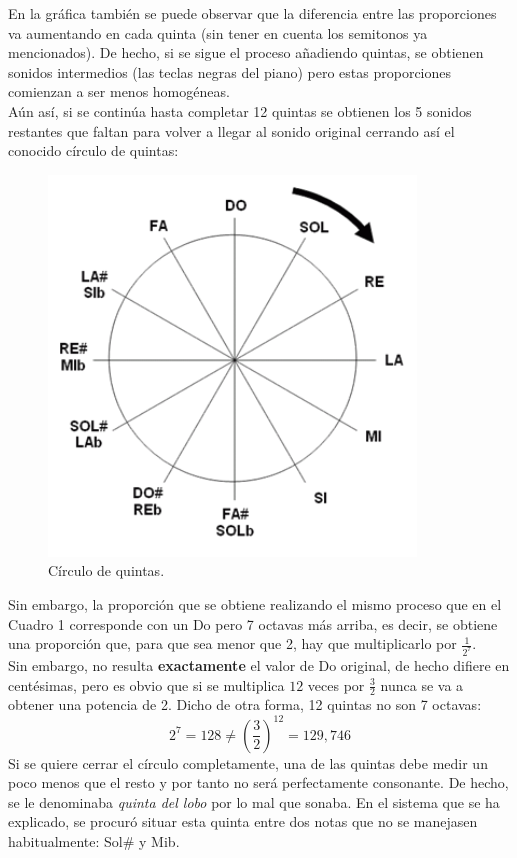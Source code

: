 \documentclass[a4paper, openright, 11pt, titlepage]{report}
\theoremstyle{definition}\newtheorem{defin}[propo]{Definition}
\theoremstyle{definition}\newtheorem{obser}[propo]{Remark}
\theoremstyle{definition}\newtheorem{ejem}[propo]{Ejemplo}
\theoremstyle{definition}\newtheorem{algoritmo}[propo]{Algoritmo}
\begin{document}
En la gráfica también se puede observar que la diferencia entre las proporciones va aumentando en cada quinta (sin tener en cuenta los semitonos ya mencionados). De hecho, si se sigue el proceso añadiendo quintas, se obtienen sonidos intermedios (las teclas negras del piano) pero estas proporciones comienzan a ser menos homogéneas.\\
Aún así, si se continúa hasta completar 12 quintas se obtienen los 5 sonidos restantes que faltan para volver a llegar al sonido original cerrando así el conocido círculo de quintas:
\begin{figure}[H]
    \centering
    \includegraphics[scale = 0.7]{quintas.png}
    \caption{Círculo de quintas.}
\end{figure}
Sin embargo, la proporción que se obtiene realizando el mismo proceso que en el Cuadro 1 corresponde con un Do pero 7 octavas más arriba, es decir, se obtiene una proporción que, para que sea menor que 2, hay que multiplicarlo por $\frac{1}{2^{7}}$.\\
Sin embargo, no resulta \textbf{exactamente} el valor de Do original, de hecho difiere en centésimas, pero es obvio que si se multiplica $12$ veces por $\frac{3}{2}$ nunca se va a obtener una potencia de 2. Dicho de otra forma, 12 quintas no son 7 octavas: $$2^{7} = 128 \not= (\frac{3}{2})^{12} = 129,746$$
Si se quiere cerrar el círculo completamente, una de las quintas debe medir un poco menos que el resto y por tanto no será perfectamente consonante. De hecho, se le denominaba \textit{quinta del lobo} por lo mal que sonaba. En el sistema que se ha explicado, se procuró situar esta quinta entre dos notas que no se manejasen habitualmente: Sol# y Mib. 
\end{document}
